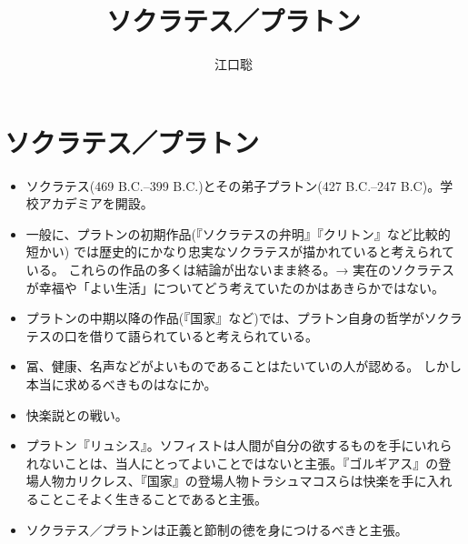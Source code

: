 \documentclass[dvipdfmx]{jsarticle}
\author{江口聡}
\title{ソクラテス／プラトン}
\begin{document}
\maketitle


\section{ソクラテス／プラトン}

\begin{itemize}

\item ソクラテス(469 B.C.--399 B.C.)とその弟子プラトン(427 B.C.--247 B.C)。学校アカデミアを開設。
\item 一般に、プラトンの初期作品(『ソクラテスの弁明』『クリトン』など比較的短かい) では歴史的にかなり忠実なソクラテスが描かれていると考えられている。 これらの作品の多くは結論が出ないまま終る。→ 実在のソクラテスが幸福や「よい生活」についてどう考えていたのかはあきらかではない。
\item プラトンの中期以降の作品(『国家』など)では、プラトン自身の哲学がソクラテスの口を借りて語られていると考えられている。

     \end{itemize}

\begin{itemize}

   \item 冨、健康、名声などがよいものであることはたいていの人が認める。
しかし本当に求めるべきものはなにか。
\item 快楽説との戦い。
\item プラトン『リュシス』。ソフィストは人間が自分の欲するものを手にいれられないことは、当人にとってよいことではないと主張。『ゴルギアス』の登場人物カリクレス、『国家』の登場人物トラシュマコスらは快楽を手に入れることこそよく生きることであると主張。
\item ソクラテス／プラトンは正義と節制の徳を身につけるべきと主張。
\end{itemize}
\end{document}
